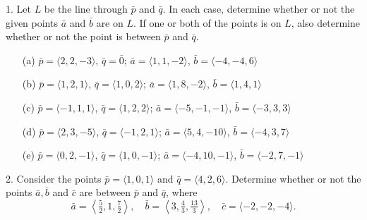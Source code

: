 \begin{exercisebox}
1. Let $L$ be the line through $\bar{p}$ and $\bar{q}$. In each case, determine whether or not the given points $\bar{a}$ and $\bar{b}$ are on $L$. If one or both of the points is on $L$, also determine whether or not the point is between $\bar{p}$ and $\bar{q}$.
\begin{itemize}
    \item[(a)] $\bar{p} = \langle 2, 2, -3 \rangle$, $\bar{q} = \bar{0}$; $\bar{a} = \langle 1, 1, -2 \rangle$, $\bar{b} = \langle -4, -4, 6 \rangle$
    \item[(b)] $\bar{p} = \langle 1, 2, 1 \rangle$, $\bar{q} = \langle 1, 0, 2 \rangle$; $\bar{a} = \langle 1, 8, -2 \rangle$, $\bar{b} = \langle 1, 4, 1 \rangle$
    \item[(c)] $\bar{p} = \langle -1, 1, 1 \rangle$, $\bar{q} = \langle 1, 2, 2 \rangle$; $\bar{a} = \langle -5, -1, -1 \rangle$, $\bar{b} = \langle -3, 3, 3 \rangle$
    \item[(d)] $\bar{p} = \langle 2, 3, -5 \rangle$, $\bar{q} = \langle -1, 2, 1 \rangle$; $\bar{a} = \langle 5, 4, -10 \rangle$, $\bar{b} = \langle -4, 3, 7 \rangle$
    \item[(e)] $\bar{p} = \langle 0, 2, -1 \rangle$, $\bar{q} = \langle 1, 0, -1 \rangle$; $\bar{a} = \langle -4, 10, -1 \rangle$, $\bar{b} = \langle -2, 7, -1 \rangle$
\end{itemize}

2. Consider the points $\bar{p} = \langle 1, 0, 1 \rangle$ and $\bar{q} = \langle 4, 2, 6 \rangle$. Determine whether or not the points $\bar{a}, \bar{b}$ and $\bar{c}$ are between $\bar{p}$ and $\bar{q}$, where
\[
\bar{a} = \left\langle \tfrac{5}{2}, 1, \tfrac{7}{2} \right\rangle,\quad \bar{b} = \left\langle 3, \tfrac{4}{3}, \tfrac{13}{3} \right\rangle,\quad \bar{c} = \langle -2, -2, -4 \rangle.
\]


\end{exercisebox}
